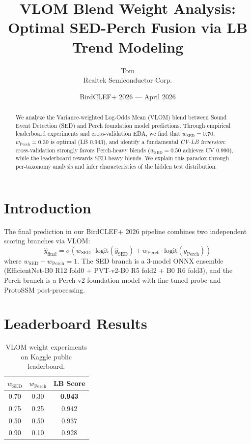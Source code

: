 \documentclass[a4paper,11pt]{article}
\title{VLOM Blend Weight Analysis:\\Optimal SED-Perch Fusion via LB Trend Modeling}
\author{Tom \\ Realtek Semiconductor Corp.}
\date{BirdCLEF+ 2026 --- April 2026}
\begin{document}
\maketitle

\begin{abstract}
We analyze the Variance-weighted Log-Odds Mean (VLOM) blend between Sound Event Detection (SED) and Perch foundation model predictions.
Through empirical leaderboard experiments and cross-validation EDA, we find that $w_\text{SED}=0.70$, $w_\text{Perch}=0.30$ is optimal (LB 0.943),
and identify a fundamental \emph{CV-LB inversion}: cross-validation strongly favors Perch-heavy blends ($w_\text{SED}=0.50$ achieves CV 0.990),
while the leaderboard rewards SED-heavy blends.
We explain this paradox through per-taxonomy analysis and infer characteristics of the hidden test distribution.
\end{abstract}

\section{Introduction}

The final prediction in our BirdCLEF+ 2026 pipeline combines two independent scoring branches via VLOM:
\begin{equation}
\hat{y}_\text{final} = \sigma\left(w_\text{SED} \cdot \text{logit}(\hat{y}_\text{SED}) + w_\text{Perch} \cdot \text{logit}(\hat{y}_\text{Perch})\right)
\end{equation}
where $w_\text{SED} + w_\text{Perch} = 1$.
The SED branch is a 3-model ONNX ensemble (EfficientNet-B0 R12 fold0 + PVT-v2-B0 R5 fold2 + B0 R6 fold3),
and the Perch branch is a Perch v2 foundation model with fine-tuned probe and ProtoSSM post-processing.

\section{Leaderboard Results}

\begin{table}[h]
\centering
\caption{VLOM weight experiments on Kaggle public leaderboard.}
\begin{tabular}{ccc}
\toprule
$w_\text{SED}$ & $w_\text{Perch}$ & LB Score \\
\midrule
0.70 & 0.30 & \textbf{0.943} \\
0.75 & 0.25 & 0.942 \\
0.50 & 0.50 & 0.937 \\
0.90 & 0.10 & 0.928 \\
\bottomrule
\end{tabular}
\label{tab:lb}
\end{table}
\end{document}

